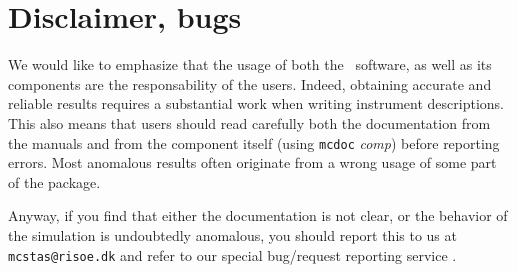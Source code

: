 %
%
%
%
%
\section{Disclaimer, bugs}

We would like to emphasize that the usage of both the \MCX\ software, as well as its components are the responsability of the users. Indeed, obtaining accurate and reliable results requires a substantial work when writing instrument descriptions. This also means that users should read carefully both the documentation from the manuals \cite{mcstasmanual} and from the component itself (using \verb+mcdoc+ {\it comp}) before reporting errors. Most anomalous results often originate from a wrong usage of some part of the package.

Anyway, if you find that either the documentation is not clear, or the behavior of the simulation is undoubtedly anomalous, you should report this to us at \verb+mcstas@risoe.dk+ and refer to our special bug/request reporting service \cite{mczilla_webpage}.
